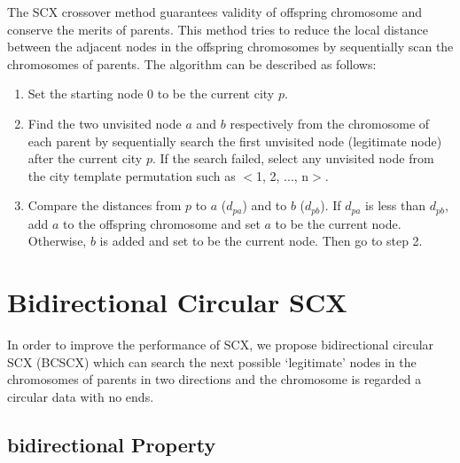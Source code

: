 The SCX crossover method guarantees validity of offspring chromosome and conserve the merits of parents. This method tries to reduce the local distance between the adjacent nodes in the offspring chromosomes by sequentially scan the chromosomes of parents. The algorithm can be described as follows\cite{ahmed2010genetic}:

\begin{enumerate}
\item{Set the starting node 0 to be the current city $p$.}
\item{Find the two unvisited node $a$ and $b$ respectively from the chromosome of each parent by sequentially search the first unvisited node (legitimate node) after the current city $p$. If the search failed, select any unvisited node from the city template permutation such as $<$1, 2, ..., n$>$.} 
\item{Compare the distances from $p$ to $a$ ($d_{pa}$) and to $b$ ($d_{pb}$). If $d_{pa}$ is less than $d_{pb}$, add $a$ to the offspring chromosome and set $a$ to be the current node. Otherwise, $b$ is added and set to be the current node. Then go to step 2.}
\end{enumerate}

\section{Bidirectional Circular SCX}

In order to improve the performance of SCX, we propose bidirectional circular SCX (BCSCX) which can search the next possible `legitimate' nodes in the chromosomes of parents in two directions and the chromosome is regarded a circular data with no ends.

\subsection{bidirectional Property}

